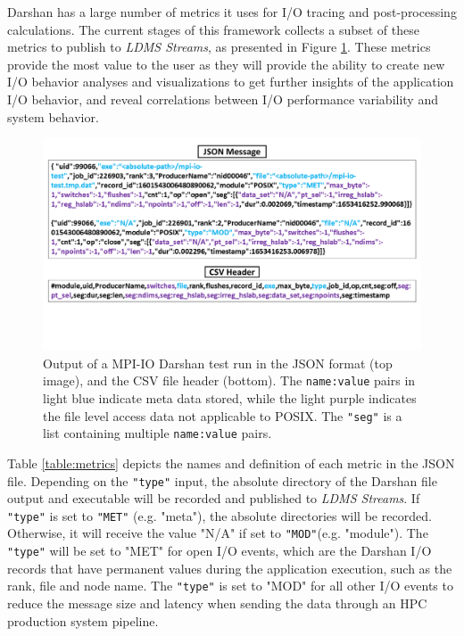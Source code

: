 Darshan has a large number of metrics it uses for I/O tracing and
post-processing calculations. The current stages of this framework
collects a subset of these metrics to publish to \emph{LDMS Streams},
as presented in Figure \ref{f:CSV Header and Output}. These metrics
provide the most value to the user as they will provide the ability to
create new I/O behavior analyses and visualizations to get further
insights of the application I/O behavior, and reveal correlations
between I/O performance variability and system behavior.
\begin{figure}
	\centering
	\includegraphics[trim={0 3cm 0 0},clip, width=1.01\linewidth]{figs/darshan-csv-json.pdf}
	\caption{Output of a MPI-IO Darshan test run in the JSON
          format (top image), and the CSV file header (bottom). 
          The \texttt{name:value} pairs in light blue
          indicate meta data stored, while the light purple indicates
          the file level access data not applicable to POSIX. 
          The \texttt{"seg"} is a list containing multiple \texttt{name:value} pairs.}
	\label{f:CSV Header and Output}
\end{figure}
Table \ref{table:metrics} depicts the names and definition of each
metric in the JSON file. Depending on the \texttt{"type"} input, the
absolute directory of the Darshan file output and executable will be
recorded and published to \emph{LDMS Streams}. If \texttt{"type"} is
set to \texttt{"MET"} (e.g. "meta"), the absolute directories will be
recorded. Otherwise, it will receive the value "N/A" if set to
\texttt{"MOD"}(e.g. "module"). The \texttt{"type"} will be set to
"MET" for open I/O events, which are the Darshan I/O records that have
permanent values during the application execution, such as the rank,
file and node name. The \texttt{"type"} is set to "MOD" for all other
I/O events to reduce the message size and latency when sending the
data through an HPC production system pipeline.

